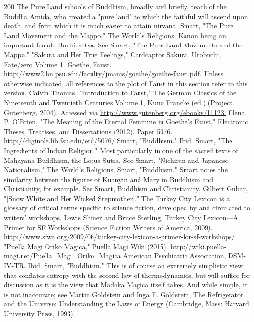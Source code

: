 \begin{thebibliography}{200}
    The Pure Land schools of Buddhism, broadly and briefly, teach of the Buddha Amida, who created a "pure land" to which the faithful will ascend upon death, and from which it is much easier to attain nirvana. Smart, "The Pure Land Movement and the Mappo," The World's Religions.
    Kanon being an important female Bodhisattva. See Smart, "The Pure Land Movements and the Mappo."
    "Sakura and Her True Feelings," Cardcaptor Sakura.
    Urobuchi, Fate/zero Volume 1.
    Goethe, Faust. \url{http://www2.hn.psu.edu/faculty/jmanis/goethe/goethe-faust.pdf}. Unless otherwise indicated, all references to the plot of Faust in this section refer to this version.
    Calvin Thomas, "Introduction to Faust," The German Classics of the Nineteenth and Twentieth Centuries Volume 1, Kuno Francke (ed.) (Project Gutenberg, 2004). Accessed via \url{http://www.gutenberg.org/ebooks/11123.}
    Elena P. O'Brien, "The Meaning of the Eternal Feminine in Goethe's Faust," Electronic Theses, Treatises, and Dissertations (2012). Paper 5076. \url{http://diginole.lib.fsu.edu/etd/5076/}
    Smart, "Buddhism."
    Ibid.
    Smart, "The Ingredients of Indian Religion."
    Most particularly in one of the sacred texts of Mahayana Buddhism, the Lotus Sutra. See Smart, "Nichiren and Japanese Nationalism," The World's Religions.
    Smart, "Buddhism."
    Smart notes the similarity between the figures of Kuanyin and Mary in Buddhism and Christianity, for example. See Smart, Buddhism and Christianity.
    Gilbert Gubar, "[Snow White and Her Wicked Stepmother]."
    The Turkey City Lexicon is a glossary of critical terms specific to science fiction, developed by and circulated to writers' workshops. Lewis Shiner and Bruce Sterling, Turkey City Lexicon—A Primer for SF Workshops (Science Fiction Writers of America, 2009). \url{http://www.sfwa.org/2009/06/turkey-city-lexicon-a-primer-for-sf-workshops/}
    "Puella Magi Oriko Magica," Puella Magi Wiki (2015). \url{http://wiki.puella-magi.net/Puella_Magi_Oriko_Magica}
    American Psychiatric Association, DSM-IV-TR.
    Ibid.
    Smart, "Buddhism."
    This is of course an extremely simplistic view that conflates entropy with the second law of thermodynamics, but will suffice for discussion as it is the view that Madoka Magica itself takes. And while simple, it is not inaccurate; see Martin Goldstein and Inga F. Goldstein, The Refrigerator and the Universe: Understanding the Laws of Energy (Cambridge, Mass: Harvard University Press, 1993).

\end{thebibliography}
